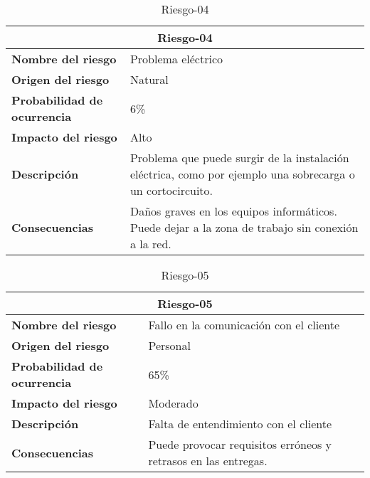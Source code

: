 \begin{table}[H]
\begin{center}
\begin{tabular}{p{} p{7cm}}
\multicolumn{2}{c}{\textbf{Riesgo-04} } \\
\hline \hline
\textbf{Nombre del riesgo} &  Problema eléctrico\\
\hline
\textbf{Origen del riesgo} & Natural\\
\hline
\textbf{Probabilidad de ocurrencia} & 6\%\\
\hline
\textbf{Impacto del riesgo} &  Alto \\
\hline
\textbf{Descripción} & Problema que puede surgir de la instalación eléctrica, como por ejemplo una sobrecarga o un cortocircuito.\\
\hline
\textbf{Consecuencias} &  Daños graves en los equipos informáticos. Puede dejar a la zona de trabajo sin conexión a la red. \\
\hline
\end{tabular}
\caption{Riesgo-04}
\label{tab:Riesgo-04}
\end{center}
\end{table}

\begin{table}[H]
\begin{center}
\begin{tabular}{p{} p{7cm}}
\multicolumn{2}{c}{\textbf{Riesgo-05} } \\
\hline \hline
\textbf{Nombre del riesgo} & Fallo en la comunicación con el cliente \\
\hline
\textbf{Origen del riesgo} & Personal\\
\hline
\textbf{Probabilidad de ocurrencia} & 65\%  \\
\hline
\textbf{Impacto del riesgo} & Moderado  \\
\hline
\textbf{Descripción} & Falta de entendimiento con el cliente  \\
\hline
\textbf{Consecuencias} & Puede provocar requisitos erróneos y retrasos en las entregas.  \\
\hline
\end{tabular}
\caption{Riesgo-05}
\label{tab:Riesgo-05}
\end{center}
\end{table}

